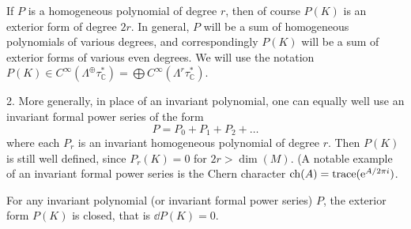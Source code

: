 \documentclass[../main]{subfiles}
\begin{document}
\setcounter{remark}{0}

\begin{remark} If $P$ is a homogeneous polynomial of degree $r$, then of course $P(K)$ is an exterior form of degree $2r$. In general, $P$ will be a sum of homogeneous polynomials of various degrees, and correspondingly $P(K)$ will be a sum of exterior forms of various even degrees. We will use the notation $P(K) \in C^{\infty}(\Lambda^{\oplus}\tau_\mathbb C^*)=\bigoplus C^{\infty}(\Lambda^r\tau_\mathbb C^*)$.
\end{remark}
\begin{remark} 2. More generally, in place of an invariant polynomial, one can equally well use an invariant formal power series of the form
\[
P = P_0 + P_1 + P_2 + \dots
\]
where each $P_r$ is an invariant homogeneous polynomial of degree $r$. Then $P(K)$ is still well defined, since $P_r(K)=0$ for $2r > \dim(M)$. (A notable example of an invariant formal power series is the Chern character $\operatorname{ch}(A)=\operatorname{trace}(\operatorname{e}^{A/2\pi i})$.
\end{remark}

\begin{lemma*}
For any invariant polynomial (or invariant formal power series) $P$, the exterior form $P(K)$ is closed, that is $\dd P(K) = 0$.
\end{lemma*}
\end{document}
